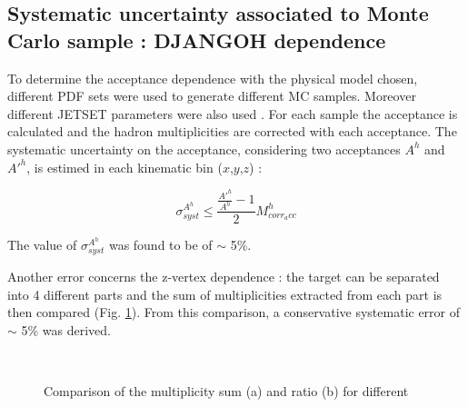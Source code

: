 
\subsection{Systematic uncertainty associated to Monte Carlo sample : DJANGOH dependence}

To determine the acceptance dependence with the physical model chosen, different PDF sets were used to generate different MC samples. Moreover different JETSET parameters were also used \cite{PDFsys}. For each sample the acceptance is calculated and the hadron multiplicities are corrected with each acceptance. The systematic uncertainty on the acceptance, considering two acceptances $A^h$ and $A'^h$, is estimed in each kinematic bin ($x$,$y$,$z$) :

\begin{equation}
  \sigma^{A^h}_{syst} \leq \frac{\frac{A'^h}{A^h}-1}{2}M^h_{corr_acc}
\end{equation}

The value of $\sigma^{A^h}_{syst}$ was found to be of $\sim$ 5\%.

Another error concerns the z-vertex dependence : the target can be separated into 4 different parts and the sum of multiplicities extracted from each part is then compared (Fig. \ref{pic:Zvertexsum}). From this comparison, a conservative systematic error of $\sim$ 5\% was derived.

\begin{figure}[!h]
  \centering
	 \\
	\caption{Comparison of the multiplicity sum (a) and ratio (b) for different }
	\label{pic:Zvertexsum}
\end{figure}

